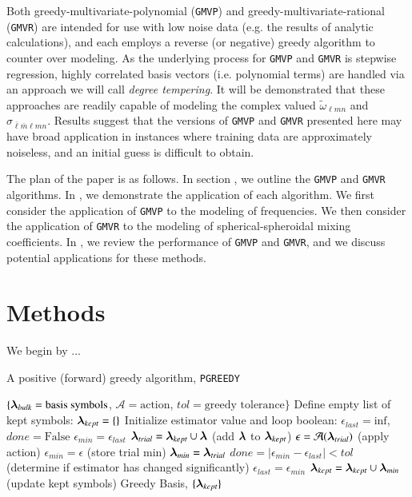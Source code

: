 \documentclass[twocolumn,aps,prd,floatfix,preprintnumbers,a4paper,nofootinbib,
superscriptaddress,10pt]{revtex4-1}
\newcommand{\cw}{\tilde{\omega}}
\def\lmn{_{\ell m n}}
\def\LMlmn{_{\bar{\ell} \bar{m} \ell m n}}
\def\gmvp#1{greedy-multivariate-polynomial#1
  (\texttt{GMVP}#1)\gdef\gmvp{\texttt{GMVP}}}
\def\gmvr#1{greedy-multivariate-rational#1
  (\texttt{GMVR}#1)\gdef\gmvr{\texttt{GMVR}}}
\begin{document}
%
Both \gmvp{} and \gmvr{} are intended for use with low noise data (e.g. the results of analytic calculations), and each employs a reverse (or negative) greedy algorithm to counter over modeling.
%
As the underlying process for \gmvp{} and \gmvr{} is stepwise regression, highly correlated basis vectors (i.e. polynomial terms) are handled via an approach we will call \textit{degree tempering}.
%
It will be demonstrated that these approaches are readily capable of modeling the complex valued $\cw\lmn$ and $\sigma\LMlmn$.
%
Results suggest that the versions of \gmvp{} and \gmvr{} presented here may have broad application in instances where training data are approximately noiseless, and an initial guess is difficult to obtain.
%
%
\par The plan of the paper is as follows.
%
In section , we outline the \gmvp{} and \gmvr{} algorithms.
%
In , we demonstrate the application of each algorithm.
%
We first consider the application of \gmvp{} to the modeling of \qnm{} frequencies.
%
We then consider the application of \gmvr{} to the modeling of spherical-spheroidal mixing coefficients.
%
In , we review the performance of \gmvp{} and \gmvr{}, and we discuss potential applications for these methods.

%
\section{Methods}
\label{meth}

We begin by ...

\hspace{1cm}
{\scriptsize
\begin{algorithm}[H]
  \caption{A positive (forward) greedy algorithm, \texttt{PGREEDY}}
  \label{alg:pgreedy}
  \begin{algorithmic}[1]
     $ \{ {\bm{\lambda}}_{bulk} = \text{basis symbols}$, $\mathcal{A} = \text{action}$, $tol=\text{greedy tolerance}\}$
    \vskip 10pt
    \State Define empty list of kept symbols: ${\bm{\lambda}}_{kept} = \{\}$
    \State Initialize estimator value and loop boolean: $\epsilon_{last} = \mathrm{inf}$, $done = \text{False}$
      \State $\epsilon_{min} = \epsilon_{last}$
        \State ${\bm{\lambda}}_{trial} = {\bm{\lambda}}_{kept} \cup {\bm{\lambda}}$ {\hskip0.525in} (add ${\bm{\lambda}}$ to ${\bm{\lambda}}_{kept}$)
        \State $\epsilon = \mathcal{A}({\bm{\lambda}}_{trial})$ {\hskip0.725in} (apply action)
          \State $\epsilon_{min} = \epsilon$  {\hskip0.725in} (store trial min)
          \State ${\bm{\lambda}}_{min} = {\bm{\lambda}}_{trial}$
        \EndIf
      \EndFor
      \State $done = |\epsilon_{min}-\epsilon_{last}|<tol$ {\hskip0.4in} (determine if estimator has changed significantly)
        \State $\epsilon_{last} = \epsilon_{min}$
        \State ${\bm{\lambda}}_{kept} = {\bm{\lambda}}_{kept} \cup {\bm{\lambda}}_{min}$ {\hskip0.4in} (update kept symbols)
      \EndIf
    \EndWhile
    \vskip 10pt
     Greedy Basis, $\{ {\bm{\lambda}}_{kept} \}$
  \end{algorithmic}
\end{algorithm}
}
\end{document}

